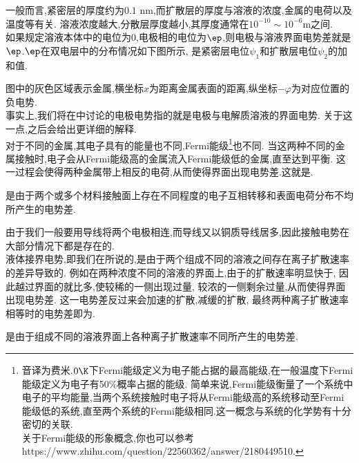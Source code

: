 \documentclass{ctexart}
\begin{document}
一般而言,紧密层的厚度约为$0.1\text{ nm}$,而扩散层的厚度与溶液的浓度,金属的电荷以及温度等有关.%
溶液浓度越大,分散层厚度越小,其厚度通常在$10^{-10}\sim10^{-6}\text{m}$之间.\\
\indent 如果规定溶液本体中的电位为$0$,电极相的电位为$\ep$,则电极与溶液界面电势差就是$\ep$.$\ep$在双电层中的分布情况如下图所示,%
是紧密层电位$\psi_1$和扩散层电位$\psi_2$的加和值.
\begin{tightcenter}
    
\end{tightcenter}
图中的灰色区域表示金属,横坐标$x$为距离金属表面的距离,纵坐标$-\varphi$为对应位置的负电势.\\
\indent 事实上,我们将在中讨论的电极电势指的就是电极与电解质溶液的界面电势.%
关于这一点,之后会给出更详细的解释.\vspace{4pt}\\
\indent 对于不同的金属,其电子具有的能量也不同,Fermi能级\footnote{音译为费米.$0\K$下Fermi能级定义为电子能占据的最高能级,在一般温度下Fermi能级定义为电子有50\%概率占据的能级.%
简单来说,Fermi能级衡量了一个系统中电子的平均能量,当两个系统接触时电子将从Fermi能级高的系统移动至Fermi能级低的系统,直至两个系统的Fermi能级相同.这一概念与系统的化学势有十分密切的关联.\\
\indent 关于Fermi能级的形象概念,你也可以参考https://www.zhihu.com/question/22560362/answer/2180449510.}也不同.%
当这两种不同的金属接触时,电子会从Fermi能级高的金属流入Fermi能级低的金属,直至达到平衡.%
这一过程会使得两种金属带上相反的电荷,从而使得界面出现电势差.这就是.
\begin{definition}[6C.3.2 接触电势]
    是由于两个或多个材料接触面上存在不同程度的电子互相转移和表面电荷分布不均所产生的电势差.
\end{definition}
由于我们一般要用导线将两个电极相连,而导线又以铜质导线居多,因此接触电势在大部分情况下都是存在的.\vspace{4pt}\\
\indent 液体接界电势,即我们在所说的,是由于两个组成不同的溶液之间存在离子扩散速率的差异导致的.%
例如在两种浓度不同的溶液的界面上,由于的扩散速率明显快于,%
因此越过界面的就比多,使较稀的一侧出现过量,%
较浓的一侧剩余过量,从而使得界面出现电势差.%
这一电势差反过来会加速的扩散,减缓的扩散,%
最终两种离子扩散速率相等时的电势差即为.
\begin{definition}[6C.3.2 液体接界电势]
    是由于组成不同的溶液界面上各种离子扩散速率不同所产生的电势差.
\end{definition}
\end{document}
